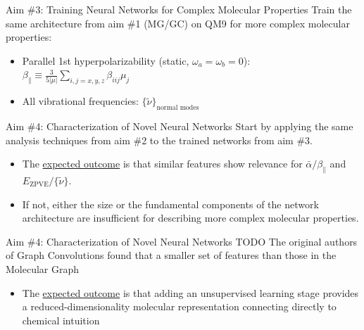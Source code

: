 \documentclass[xetex,compress]{beamer}
\begin{document}

\begin{frame}{Aim \#3: Training Neural Networks for Complex Molecular Properties}
  Train the same architecture from aim \#1 (MG/GC) on QM9 for more complex molecular properties:
  \begin{itemize}
  \item Parallel 1st hyperpolarizability (static, \(\omega_{a} = \omega_{b} = 0\)): \(\beta_{\parallel} \equiv \frac{3}{5|\mu|} \sum_{i,j=x,y,z} \beta_{iij} \mu_{j}\)
  \item All vibrational frequencies: \(\{\tilde{\nu}\}_{\text{normal modes}}\)
  \end{itemize}
\end{frame}

\begin{frame}{Aim \#4: Characterization of Novel Neural Networks}
  Start by applying the same analysis techniques from aim \#2 to the trained networks from aim \#3.
  \begin{itemize}
  \item The \underline{expected outcome} is that similar features show relevance for \(\bar{\alpha}/\beta_{\parallel}\) and \(E_{\text{ZPVE}}/\{\tilde{\nu}\}\).
  \item If not, either the size or the fundamental components of the network architecture are insufficient for describing more complex molecular properties.
  \end{itemize}
\end{frame}

\begin{frame}{Aim \#4: Characterization of Novel Neural Networks}
  TODO
  The original authors of Graph Convolutions found that a smaller set of features than those in the Molecular Graph
  \begin{itemize}
  \item The \underline{expected outcome} is that adding an unsupervised learning stage provides a reduced-dimensionality molecular representation connecting directly to chemical intuition    
  \end{itemize}
\end{frame}
\end{document}
